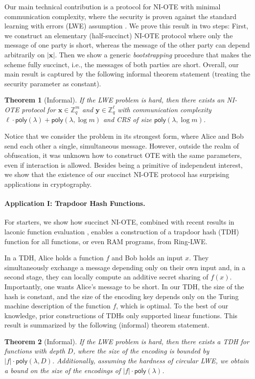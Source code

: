 \documentclass{article}
\newtheorem{theorem}{Theorem}\newtheorem{lemma}[theorem]{Lemma}\newtheorem{proposition}[theorem]{Proposition}\newtheorem{corollary}[theorem]{Corollary}\newtheorem{definition}[theorem]{Definition}\newtheorem{claim}[theorem]{Claim}
\newcommand{\Z}{\mathbb{Z}}
\newcommand{\poly}{\mathsf{poly}}
\renewcommand{\sec}{\ensuremath{\lambda}}
\begin{document}
Our main technical contribution is a protocol for NI-OTE with minimal communication complexity, where the security is proven against the standard learning with errors (LWE) assumption \cite{STOC:Regev05}.
We prove this result in two steps: First, we construct an elementary (half-succinct) NI-OTE protocol where only the message of one party is short, whereas the message of the other party can depend arbitrarily on $|\mathbf{x}|$. Then we show a generic \emph{bootstrapping} procedure that makes the scheme fully succinct, i.e., the messages of both parties are short.
Overall, our main result is captured by the following informal theorem statement (treating the security parameter as constant).
\begin{theorem}[Informal]
    If the LWE problem is hard, then there exists an NI-OTE protocol for $\mathbf{x}\in\Z_q^m$ and $\mathbf{y}\in\Z_q^\ell$ with communication complexity $\ell\cdot \poly(\sec) + \poly(\sec, \log m)$ and CRS of size $\poly(\sec, \log m)$.
\end{theorem}
%
{Notice that we consider the problem in its strongest form, where Alice and Bob send each other a single, simultaneous message. However, outside the realm of obfuscation, it was unknown how to construct OTE with the same parameters, even if interaction is allowed.}
Besides being a primitive of independent interest, we show that the existence of our succinct NI-OTE protocol has surprising applications in cryptography. 

\paragraph{Application I: Trapdoor Hash Functions.}
For starters, we show how succinct NI-OTE, combined with recent results in laconic function evaluation \cite{FOCS:QuaWeeWic18,FOCS:HsiLinLuo23,C:DHMWW24}, enables a construction of a trapdoor hash (TDH) function \cite{C:DGIMMO19} for all functions, or even RAM programs, from Ring-LWE. 

{In a TDH, Alice holds a function $f$ and Bob holds an input $x$. They simultaneously exchange a message depending only on their own input and, in a second stage, they can locally compute an additive secret sharing of $f(x)$. Importantly, one wants Alice's message to be short. In our TDH, the} size of the hash is constant, and the size of the encoding key depends only on the {Turing machine} description of the function $f$, which is optimal. {To the best of our knowledge, prior constructions of TDHs \cite{C:DGIMMO19,C:RoySin21} only supported linear functions.}
This result is summarized by the following (informal) theorem statement.
\begin{theorem}[Informal]
    If the LWE problem is hard, then there exists a TDH for functions with depth $D$, where the size of the encoding is bounded by {$|f|\cdot \poly(\sec, D)$}. Additionally, assuming the hardness of \emph{circular} LWE, we obtain a bound on the size of the encodings of $|f|\cdot \poly(\sec)$.
\end{theorem}
\end{document}
